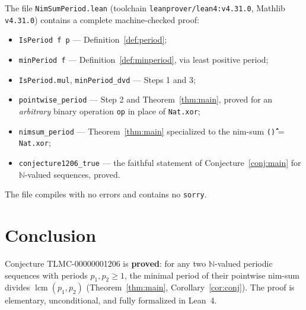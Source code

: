 \documentclass[11pt]{article}
\theoremstyle{definition}
\theoremstyle{remark}
\begin{document}
The file \texttt{NimSumPeriod.lean} (toolchain \texttt{leanprover/lean4:v4.31.0}, Mathlib \texttt{v4.31.0}) contains a complete machine-checked proof:
\begin{itemize}
\item \texttt{IsPeriod f p} --- Definition~\ref{def:period};
\item \texttt{minPeriod f} --- Definition~\ref{def:minperiod}, via least positive period;
\item \texttt{IsPeriod.mul}, \texttt{minPeriod\_dvd} --- Steps 1 and 3;
\item \texttt{pointwise\_period} --- Step 2 and Theorem~\ref{thm:main}, proved for an \emph{arbitrary} binary operation \texttt{op} in place of \texttt{Nat.xor};
\item \texttt{nimsum\_period} --- Theorem~\ref{thm:main} specialized to the nim-sum \texttt{(\^\^\^)} = \texttt{Nat.xor};
\item \texttt{conjecture1206\_true} --- the faithful statement of Conjecture~\ref{conj:main} for $\mathbb{N}$-valued sequences, proved.
\end{itemize}
The file compiles with no errors and contains no \texttt{sorry}.

\section{Conclusion}

Conjecture \textup{TLMC-00000001206} is \textbf{proved}: for any two $\mathbb{N}$-valued periodic sequences with periods $p_1, p_2 \ge 1$, the minimal period of their pointwise nim-sum divides $\operatorname{lcm}(p_1, p_2)$ (Theorem~\ref{thm:main}, Corollary~\ref{cor:conj}). The proof is elementary, unconditional, and fully formalized in Lean~4.
\end{document}
